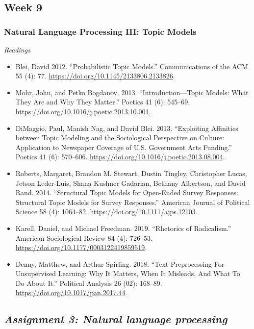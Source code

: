 \documentclass[
  10pt,
]{article}
\providecommand{\tightlist}{%
  \setlength{\itemsep}{0pt}\setlength{\parskip}{0pt}}
\begin{document}
\hypertarget{week-9}{%
\subsection{Week 9}\label{week-9}}

\hypertarget{natural-language-processing-iii-topic-models}{%
\subsubsection{Natural Language Processing III: Topic
Models}\label{natural-language-processing-iii-topic-models}}

\emph{Readings}

\begin{itemize}
\tightlist
\item
  Blei, David 2012. ``Probabilistic Topic Models.'' Communications of
  the ACM 55 (4): 77. \url{https://doi.org/10.1145/2133806.2133826}.
\item
  Mohr, John, and Petko Bogdanov. 2013. ``Introduction---Topic Models:
  What They Are and Why They Matter.'' Poetics 41 (6): 545--69.
  \url{https://doi.org/10.1016/j.poetic.2013.10.001}.
\item
  DiMaggio, Paul, Manish Nag, and David Blei. 2013. ``Exploiting
  Affinities between Topic Modeling and the Sociological Perspective on
  Culture: Application to Newspaper Coverage of U.S. Government Arts
  Funding.'' Poetics 41 (6): 570--606.
  \url{https://doi.org/10.1016/j.poetic.2013.08.004}.
\item
  Roberts, Margaret, Brandon M. Stewart, Dustin Tingley, Christopher
  Lucas, Jetson Leder-Luis, Shana Kushner Gadarian, Bethany Albertson,
  and David Rand. 2014. ``Structural Topic Models for Open-Ended Survey
  Responses: Structural Topic Models for Survey Responses.'' American
  Journal of Political Science 58 (4): 1064--82.
  \url{https://doi.org/10.1111/ajps.12103}.
\item
  Karell, Daniel, and Michael Freedman. 2019. ``Rhetorics of
  Radicalism.'' American Sociological Review 84 (4): 726--53.
  \url{https://doi.org/10.1177/0003122419859519}.
\item
  Denny, Matthew, and Arthur Spirling. 2018. ``Text Preprocessing For
  Unsupervised Learning: Why It Matters, When It Misleads, And What To
  Do About It.'' Political Analysis 26 (02): 168--89.
  \url{https://doi.org/10.1017/pan.2017.44}.
\end{itemize}

\hypertarget{assignment-3-natural-language-processing}{%
\subsection{\texorpdfstring{\emph{Assignment 3: Natural language
processing}}{Assignment 3: Natural language processing}}\label{assignment-3-natural-language-processing}}
\end{document}
